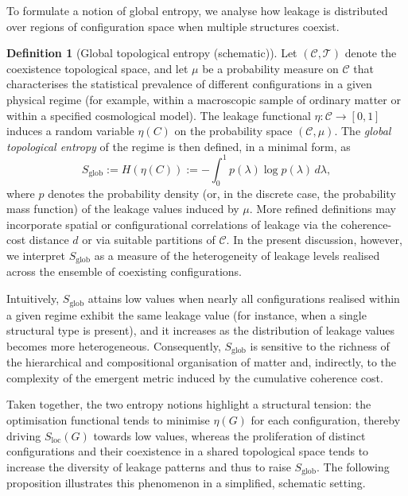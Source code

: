 \documentclass[11pt,a4paper]{article}
\theoremstyle{definition}
\newtheorem{definition}[theorem]{Definition}
\newcommand{\Cconf}{\mathcal{C}} %
\begin{document}
To formulate a notion of global entropy, we analyse how leakage is distributed over regions of configuration space when multiple structures coexist.

\begin{definition}[Global topological entropy (schematic)]
Let \((\Cconf,\mathscr{T})\) denote the coexistence topological space, and let \(\mu\) be a probability measure on \(\Cconf\) that characterises the statistical prevalence of different configurations in a given physical regime (for example, within a macroscopic sample of ordinary matter or within a specified cosmological model). The leakage functional \(\eta : \Cconf \to [0,1]\) induces a random variable \(\eta(C)\) on the probability space \((\Cconf,\mu)\). The \emph{global topological entropy} of the regime is then defined, in a minimal form, as
\[
 S_{\mathrm{glob}} := H(\eta(C)) := - \int_0^1 p(\lambda) \log p(\lambda) \, d\lambda,
\]
where \(p\) denotes the probability density (or, in the discrete case, the probability mass function) of the leakage values induced by \(\mu\). More refined definitions may incorporate spatial or configurational correlations of leakage via the coherence-cost distance \(d\) or via suitable partitions of \(\Cconf\). In the present discussion, however, we interpret \(S_{\mathrm{glob}}\) as a measure of the heterogeneity of leakage levels realised across the ensemble of coexisting configurations.
\end{definition}

Intuitively, \(S_{\mathrm{glob}}\) attains low values when nearly all configurations realised within a given regime exhibit the same leakage value (for instance, when a single structural type is present), and it increases as the distribution of leakage values becomes more heterogeneous. Consequently, \(S_{\mathrm{glob}}\) is sensitive to the richness of the hierarchical and compositional organisation of matter and, indirectly, to the complexity of the emergent metric induced by the cumulative coherence cost.

Taken together, the two entropy notions highlight a structural tension: the optimisation functional tends to minimise \(\eta(G)\) for each configuration, thereby driving \(S_{\mathrm{loc}}(G)\) towards low values, whereas the proliferation of distinct configurations and their coexistence in a shared topological space tends to increase the diversity of leakage patterns and thus to raise \(S_{\mathrm{glob}}\). The following proposition illustrates this phenomenon in a simplified, schematic setting.
\end{document}
